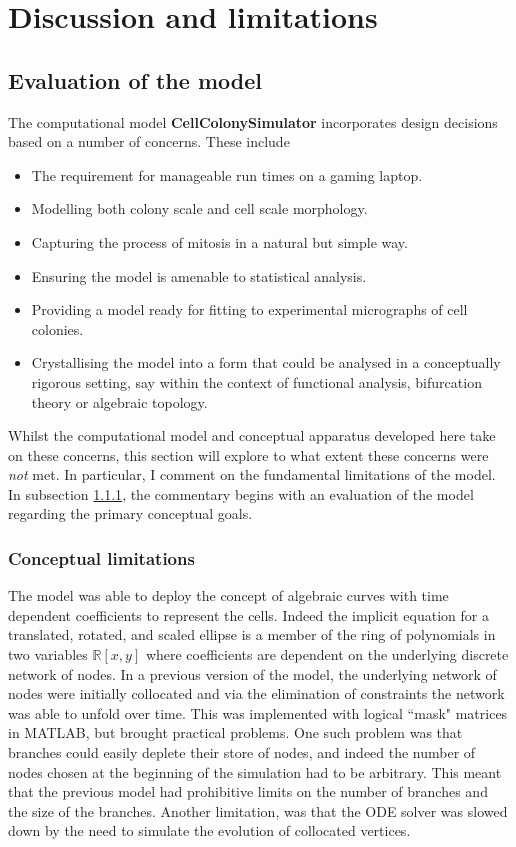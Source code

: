 \chapter{Discussion and limitations}
\section{Evaluation of the model}
The computational model \textbf{CellColonySimulator} incorporates
design decisions based on a number of concerns. These include
\begin{itemize}
    \item The requirement for manageable run times on a gaming laptop.
    \item Modelling both colony scale and cell scale morphology.
    \item Capturing the process of mitosis in a natural but simple way.
    \item Ensuring the model is amenable to statistical analysis.
    \item Providing a model ready for fitting to experimental micrographs of cell colonies.
    \item Crystallising the model into a form that could be analysed in a conceptually 
          rigorous setting, say within the context of functional analysis,
          bifurcation theory or algebraic topology.
\end{itemize}
Whilst the computational model and conceptual apparatus developed here take on these concerns,
this section will explore to what extent these concerns were \textit{not} met. In particular, I comment on the
fundamental limitations of the model. In subsection \ref{conceptLims}, the commentary begins 
with an evaluation of the model regarding the primary conceptual goals.

\subsection{Conceptual limitations} \label{conceptLims}
The model was able to deploy the concept of algebraic curves with time dependent coefficients 
to represent the cells. Indeed the implicit equation for a translated, rotated, and scaled ellipse 
is a member of the ring of polynomials in two variables $\mathbb{R}[x,y]$ where coefficients are
dependent on the underlying discrete network of nodes. In a previous version of the model, 
the underlying network of nodes were initially collocated and via the elimination 
of constraints the network was able to unfold over time. This was implemented with
logical ``mask" matrices in MATLAB, but 
brought practical problems. One such problem was that branches 
could easily deplete their store of nodes, and indeed the number of nodes
chosen at the beginning of the simulation had to be arbitrary. This meant that
the previous model had prohibitive limits on the number of branches and the size
of the branches. Another limitation, was that the ODE solver was slowed
down by the need to simulate the evolution of collocated vertices.
\\

